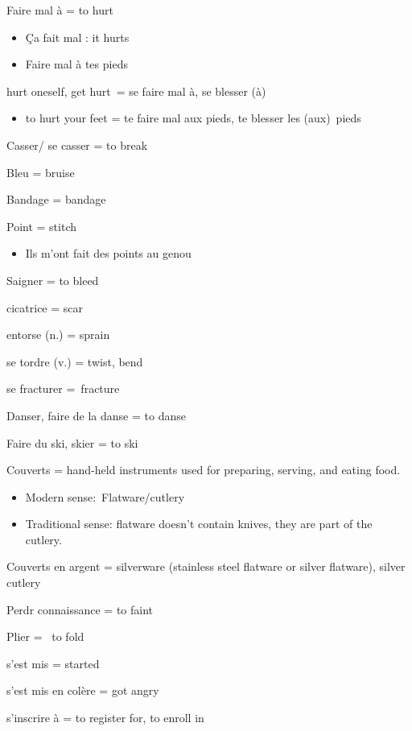 {Faire mal à = to hurt}

\begin{itemize}
\item
  Ça fait mal : it hurts~
\item
  Faire mal à tes pieds~
\end{itemize}

{hurt oneself, get hurt~= se faire mal à, se blesser (à)}

\begin{itemize}
\item
  {to hurt your feet = te faire mal aux pieds, te blesser les
  (aux)~pieds}
\end{itemize}

{Casser/ se casser = to break}

{Bleu = bruise}

{Bandage = bandage~}

{Point = stitch~}

\begin{itemize}
\item
  {Ils m'ont fait des points au genou~}
\end{itemize}

{Saigner = to bleed}

{cicatrice = scar}

{entorse (n.) = sprain}

{se tordre (v.) = twist}{, bend}

{se fracturer =~}{fracture}

Danser, faire de la danse = to danse~

Faire du ski, skier = to ski

Couverts = hand-held instruments used for preparing, serving, and eating
food.~

\begin{itemize}
\item
  Modern sense:~Flatware/cutlery
\item
  Traditional sense: flatware doesn't contain knives, they are part of
  the cutlery.
\end{itemize}

Couverts en argent = silverware (stainless steel flatware or silver
flatware), silver cutlery~

Perdr connaissance = to faint

Plier =~ to fold

s'est mis = started

s'est mis en colère = got angry

s'inscrire à = to register for, to enroll in

